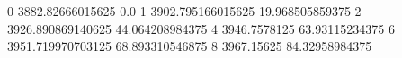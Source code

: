 0 3882.82666015625 0.0
1 3902.795166015625 19.968505859375
2 3926.890869140625 44.064208984375
4 3946.7578125 63.93115234375
6 3951.719970703125 68.893310546875
8 3967.15625 84.32958984375
